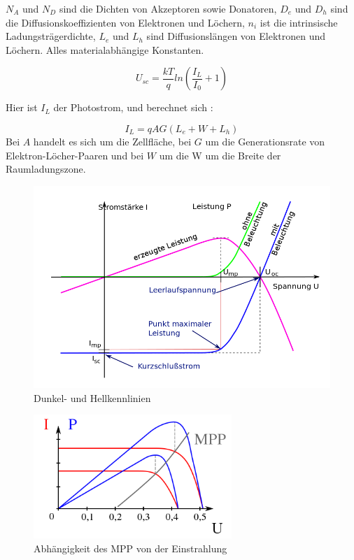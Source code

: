 \documentclass[a4paper,bibtotoc,oneside]{scrbook}
\begin{document}
  $N_A$ und $N_D$ sind die Dichten von Akzeptoren sowie Donatoren, $D_e$ und $D_h$ sind die Diffusionskoeffizienten von Elektronen und Löchern, $n_i$ ist die intrinsische Ladungsträgerdichte, $L_e$ und $L_h$ sind Diffusionslängen von Elektronen und Löchern. Alles materialabhängige Konstanten.
  
  \begin{equation}
     U_{sc} = \frac {k T}{q} ln (\frac {I_L}{I_0} + 1 )
  \end{equation}
  
  Hier ist $I_L$ der Photostrom, und berechnet sich :
  
  \begin{equation}
     I_{L} = q A G ( L_e + W + L_h )
  \end{equation}
Bei $A$ handelt es sich um die Zellfläche, bei $G$ um die Generationsrate von Elektron-Löcher-Paaren und bei $W$ um die W um die Breite der Raumladungszone. 

\begin{figure}[htbp]
\centering
\includegraphics[width=125mm]{img/kennlinie.png}
\caption{Dunkel- und Hellkennlinien}\label{kennlinie}
\end{figure}

\begin{figure}[htbp]
\centering
\includegraphics[width=75mm]{img/mpp.png}
\caption{Abhängigkeit des MPP von der Einstrahlung}\label{mpp}
\end{figure}
\end{document}
